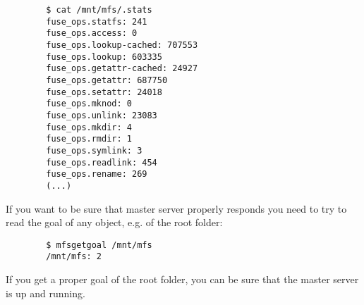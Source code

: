 \documentclass[a4paper,11pt,english]{report}
\begin{document}
		\begin{lstlisting}
		$ cat /mnt/mfs/.stats
		fuse_ops.statfs: 241
		fuse_ops.access: 0
		fuse_ops.lookup-cached: 707553
		fuse_ops.lookup: 603335
		fuse_ops.getattr-cached: 24927
		fuse_ops.getattr: 687750
		fuse_ops.setattr: 24018
		fuse_ops.mknod: 0
		fuse_ops.unlink: 23083
		fuse_ops.mkdir: 4
		fuse_ops.rmdir: 1
		fuse_ops.symlink: 3
		fuse_ops.readlink: 454
		fuse_ops.rename: 269
		(...)
		\end{lstlisting}
		
		If you want to be sure that master server properly responds you need to try to read the goal of any object, e.g. of the root folder:
		
		\begin{lstlisting}
		$ mfsgetgoal /mnt/mfs
		/mnt/mfs: 2
		\end{lstlisting}
		
		If you get a proper goal of the root folder, you can be sure that the master server is up and running.
\end{document}
